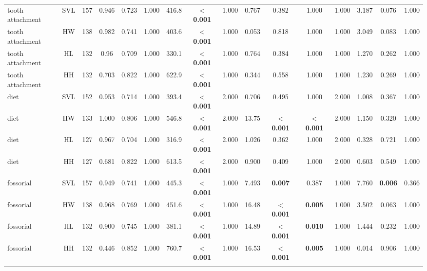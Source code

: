 \begin{longtable}{lccccccccccccccc}
\hline
tooth attachment & SVL & 157 & 0.946 & 0.723 & 1.000 & 416.8 & \textbf{$<$ 0.001} & 1.000 & 0.767 & 0.382 & 1.000 & 1.000 & 3.187 & 0.076 & 1.000 \\ 
tooth attachment & HW & 138 & 0.982 & 0.741 & 1.000 & 403.6 & \textbf{$<$ 0.001} & 1.000 & 0.053 & 0.818 & 1.000 & 1.000 & 3.049 & 0.083 & 1.000 \\ 
tooth attachment & HL & 132 & 0.96 & 0.709 & 1.000 & 330.1 & \textbf{$<$ 0.001} & 1.000 & 0.764 & 0.384 & 1.000 & 1.000 & 1.270 & 0.262 & 1.000 \\ 
tooth attachment & HH & 132 & 0.703 & 0.822 & 1.000 & 622.9 & \textbf{$<$ 0.001} & 1.000 & 0.344 & 0.558 & 1.000 & 1.000 & 1.230 & 0.269 & 1.000 \\ 
diet & SVL & 152 & 0.953 & 0.714 & 1.000 & 393.4 & \textbf{$<$ 0.001} & 2.000 & 0.706 & 0.495 & 1.000 & 2.000 & 1.008 & 0.367 & 1.000 \\ 
diet & HW & 133 & 1.000 & 0.806 & 1.000 & 546.8 & \textbf{$<$ 0.001} & 2.000 & 13.75 & \textbf{$<$ 0.001} & \textbf{$<$ 0.001} & 2.000 & 1.150 & 0.320 & 1.000 \\ 
diet & HL & 127 & 0.967 & 0.704 & 1.000 & 316.9 & \textbf{$<$ 0.001} & 2.000 & 1.026 & 0.362 & 1.000 & 2.000 & 0.328 & 0.721 & 1.000 \\ 
diet & HH & 127 & 0.681 & 0.822 & 1.000 & 613.5 & \textbf{$<$ 0.001} & 2.000 & 0.900 & 0.409 & 1.000 & 2.000 & 0.603 & 0.549 & 1.000 \\ 
fossorial & SVL & 157 & 0.949 & 0.741 & 1.000 & 445.3 & \textbf{$<$ 0.001} & 1.000 & 7.493 & \textbf{0.007} & 0.387 & 1.000 & 7.760 & \textbf{0.006} & 0.366 \\ 
fossorial & HW & 138 & 0.968 & 0.769 & 1.000 & 451.6 & \textbf{$<$ 0.001} & 1.000 & 16.48 & \textbf{$<$ 0.001} & \textbf{0.005} & 1.000 & 3.502 & 0.063 & 1.000 \\ 
fossorial & HL & 132 & 0.900 & 0.745 & 1.000 & 381.1 & \textbf{$<$ 0.001} & 1.000 & 14.89 & \textbf{$<$ 0.001} & \textbf{0.010} & 1.000 & 1.444 & 0.232 & 1.000 \\ 
fossorial & HH & 132 & 0.446 & 0.852 & 1.000 & 760.7 & \textbf{$<$ 0.001} & 1.000 & 16.53 & \textbf{$<$ 0.001} & \textbf{0.005} & 1.000 & 0.014 & 0.906 & 1.000 \\ 
\hline

\label{table_main_results}
\end{longtable}

